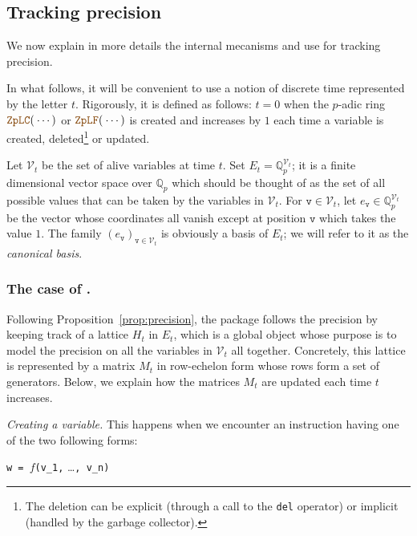 \documentclass[sigconf]{acmart}
\newcommand{\Q}{\mathbb Q}
\newcommand{\Qp}{\Q_p}
\newcommand{\calV}{\mathcal{V}}
\newcommand{\ttv}{\texttt{v}\xspace}
\newcommand{\ZpLC}{\text{\color{output} \rm \tt ZpLC}\xspace}
\newcommand{\ZpLF}{\text{\color{output} \rm \tt ZpLF}\xspace}
\theoremstyle{definition}
\begin{document}
\subsection{Tracking precision}
\label{ssec:trackprec}

We now explain in more details the internal mecanisms \ZpLC and \ZpLF 
use for tracking precision. 

In what follows, it will be convenient to use a notion of discrete time 
represented by the letter $t$. Rigorously, it is defined as follows: 
$t=0$ when the $p$-adic ring $\ZpLC(\:\cdots)$ or $\ZpLF(\:\cdots)$ is 
created and increases by $1$ each time a variable is created, 
deleted\footnote{The deletion can be explicit (through a call to the 
\texttt{del} operator) or implicit (handled by the garbage collector).} 
or updated.

Let $\calV_t$ be the set of alive variables at time $t$. Set $E_t = 
\Qp^{\calV_t}$; it is a finite dimensional vector space over $\Qp$ which 
should be thought of as the set of all possible values that can be taken by 
the variables in $\calV_t$. For $\ttv \in \calV_t$, let $e_\ttv \in
\Qp^{\calV_t}$ be the vector whose coordinates all vanish except 
at position $\ttv$ which takes the value $1$. The family 
$(e_\ttv)_{\ttv \in \calV_t}$ is obviously a basis of $E_t$; we will 
refer to it as the \emph{canonical basis}.

\subsubsection{The case of \ZpLC.}

Following Proposition~\ref{prop:precision},
the package \ZpLC follows the precision by keeping track of a lattice
$H_t$ in $E_t$, which is a global object whose purpose is to model the 
precision on all the variables in $\calV_t$ all together.
Concretely, this lattice is represented by a matrix $M_t$ in row-echelon 
form whose rows form a set of generators.
Below, we explain how the matrices $M_t$ are updated each time
$t$ increases.

\smallskip

\noindent \textit{Creating a variable.}
%
This happens when we encounter an instruction having one of the
two following forms:

\medskip

\noindent \hspace{5mm} \makebox[2.5cm]{[Computation]\hfill\null}
\verb?w = ?$f$\verb?(v_1,? \ldots\verb?, v_n)?
\end{document}
